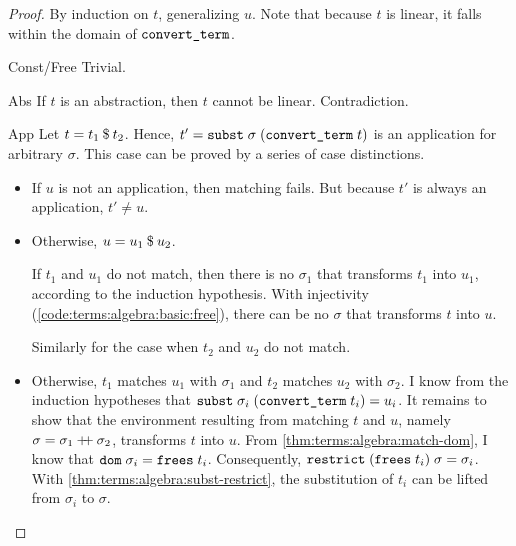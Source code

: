 \begin{proof}
  By induction on $t$, generalizing $u$.
  Note that because $t$ is linear, it falls within the domain of $\texttt{\textup{convert\_term}}$.
  \begin{induction}
    \item[Const/Free]
      Trivial.
    \item[Abs]
      If $t$ is an abstraction, then $t$ cannot be linear. Contradiction.
    \item[App]
      Let $t = t_1\mathbin{\$}t_2$.
      Hence, $t' = \texttt{\textup{subst}}\;\sigma\;(\texttt{\textup{convert\_term}}\;t)$ is an application for arbitrary $\sigma$.
      This case can be proved by a series of case distinctions.
      \begin{itemize}
        \item
          If $u$ is not an application, then matching fails.
          But because $t'$ is always an application, $t' \neq u$.
        \item
          Otherwise, $u = u_1\mathbin{\$}u_2$.

          If $t_1$ and $u_1$ do not match, then there is no $\sigma_1$ that transforms $t_1$ into $u_1$, according to the induction hypothesis.
          With injectivity (\cref{code:terms:algebra:basic:free}), there can be no $\sigma$ that transforms $t$ into $u$.

          Similarly for the case when $t_2$ and $u_2$ do not match.
        \item
          Otherwise, $t_1$ matches $u_1$ with $\sigma_1$ and $t_2$ matches $u_2$ with $\sigma_2$.
          I know from the induction hypotheses that $\texttt{\textup{subst}}\;\sigma_i\;(\texttt{\textup{convert\_term}}\;t_i) = u_i$.
          It remains to show that the environment resulting from matching $t$ and $u$, namely $\sigma = \sigma_1 \mathbin{+\!\!+} \sigma_2$, transforms $t$ into $u$.
          From \cref{thm:terms:algebra:match-dom}, I know that $\texttt{\textup{dom}}\;\sigma_i = \texttt{\textup{frees}}\;t_i$.
          Consequently, $\texttt{\textup{restrict}}\;(\texttt{\textup{frees}}\;t_i)\;\sigma = \sigma_i$.
          With \cref{thm:terms:algebra:subst-restrict}, the substitution of $t_i$ can be lifted from $\sigma_i$ to $\sigma$. \qedhere
      \end{itemize}
  \end{induction}
\end{proof}

